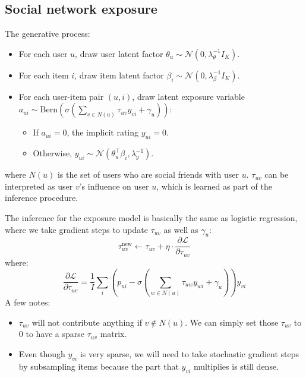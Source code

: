 \subsection{Social network exposure}
The generative process:
\begin{itemize}
\item For each user $u$, draw user latent factor $\theta_{u} \sim \mathcal{N}(0, \lambda_\theta^{-1} I_K)$.
\item For each item $i$, draw item latent factor $\beta_{i} \sim \mathcal{N}(0, \lambda_\beta^{-1} I_K)$.
\item For each user-item pair $(u, i)$, draw latent exposure variable $a_{ui} \sim \text{Bern}(\sigma(\sum_{v\in N(u)} \tau_{uv} y_{vi} + \gamma_u))$:
\begin{itemize}
\item If $a_{ui} = 0$, the implicit rating $y_{ui} = 0$.
\item Otherwise, $y_{ui} \sim \mathcal{N}(\theta_u^\top\beta_i, \lambda_y^{-1})$.
\end{itemize}
\end{itemize}
where $N(u)$ is the set of users who are social friends with user $u$. $\tau_{uv}$ can be interpreted as user $v$'s influence on user $u$, which is learned as part of the inference procedure. 

The inference for the exposure model is basically the same as logistic regression, where we take gradient steps to update $\tau_{uv}$ as well as $\gamma_u$:
\[
\textstyle\tau_{uv}^\text{new} \leftarrow \tau_{uv} + \eta \cdot \frac{\partial \mathcal{L}}{\partial \tau_{uv}}
\]
where:
\[
\textstyle\frac{\partial \mathcal{L}}{\partial \tau_{uv}} = \frac{1}{I}\sum_i (p_{ui} - \sigma(\sum_{w\in N(u)} \tau_{uw} y_{wi} + \gamma_u)) y_{vi}
\] 
A few notes:
\begin{itemize}
\item $\tau_{uv}$ will not contribute anything if $v \notin N(u)$. We can simply set those $\tau_{uv}$ to $0$ to have a sparse $\tau_{uv}$ matrix.
\item Even though $y_{vi}$ is very sparse, we will need to take stochastic gradient steps by subsampling items because the part that $y_{vi}$ multiplies is still dense. 
\end{itemize}

